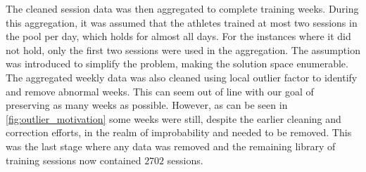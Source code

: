 The cleaned session data was then aggregated to complete training weeks.
During this aggregation, it was assumed that the athletes trained at most two sessions in the pool per day, which holds for almost all days.
For the instances where it did not hold, only the first two sessions were used in the aggregation.
The assumption was introduced to simplify the problem, making the solution space enumerable.
The aggregated weekly data was also cleaned using local outlier factor to identify and remove abnormal weeks.
This can seem out of line with our goal of preserving as many weeks as possible.
However, as can be seen in \cref{fig:outlier_motivation} some weeks were still, despite the earlier cleaning and correction efforts, in the realm of improbability and needed to be removed.
This was the last stage where any data was removed and the remaining library of training sessions now contained $2702$ sessions.
